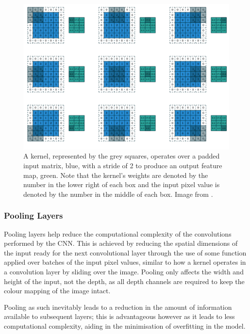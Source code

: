 \begin{figure}
	\begin{center}
		\includegraphics[scale=0.45]{Chapter2/figs/kernel.png}
	\end{center}
	\caption[A kernel, represented by the grey squares, operates over a padded input matrix, blue, with a stride of 2 to produce an output feature map, green.]{A kernel, represented by the grey squares, operates over a padded input matrix, blue, with a stride of 2 to produce an output feature map, green. Note that the kernel's weights are denoted by the number in the lower right of each box and the input pixel value is denoted by the number in the middle of each box. Image from \cite{dumoulin_160307285_2018}.}
	\label{fig:kernels}
\end{figure}


\subsubsection{Pooling Layers}\label{ch:Background,sec:CNN,sub:CNN,subsubsec:pooling}

Pooling layers help reduce the computational complexity of the convolutions performed by the CNN. This is achieved by reducing the spatial dimensions of the input ready for the next convolutional layer through the use of some function applied over batches of the input pixel values, similar to how a kernel operates in a convolution layer by sliding over the image. Pooling only affects the width and height of the input, not the depth, as all depth channels are required to keep the colour mapping of the image intact. 

Pooling as such inevitably leads to a reduction in the amount of information available to subsequent layers; this is advantageous however as it leads to less computational complexity, aiding in the minimisation of overfitting in the model. 

